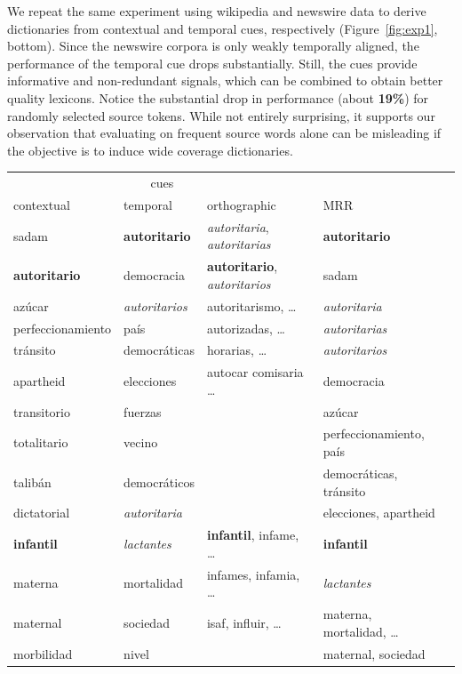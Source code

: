 \documentclass{article}
\newcommand{\figref}[1]{Figure~\ref{#1}}
\begin{document}
We repeat the same experiment using wikipedia and newswire data to derive dictionaries from contextual and temporal cues, respectively (\figref{fig:exp1}, bottom).  Since the newswire corpora is only weakly temporally aligned, the performance of the temporal cue drops substantially.  Still, the cues provide informative and non-redundant signals, which can be combined to obtain better quality lexicons.  Notice the substantial drop in performance (about {\bf 19\%}) for randomly selected source tokens.  While not entirely surprising, it supports our observation that evaluating on frequent source words alone can be misleading if the objective is to induce wide coverage dictionaries.\\

\begin{table}[h!]
\setlength{\tabcolsep}{1ex}
\footnotesize
\begin{center}
\begin{tabular}{lllll}
\multicolumn{3}{c}{cues}\\
\cline{1-3}
contextual		&	temporal	&	orthographic	&	MRR	\\
\hline
sadam	&	{\bf autoritario}	&	{\em autoritaria}, {\em autoritarias} &	{\bf autoritario}	\\
{\bf autoritario}	&	democracia	&	{\bf autoritario}, {\em autoritarios} &	sadam\\
az\'{u}car	&	{\em autoritarios}	&	autoritarismo, \dots &	{\em autoritaria}\\
perfeccionamiento	&	país	&	 autorizadas, \dots &	{\em autoritarias}\\
tr\'{a}nsito	&	democr\'{a}ticas	&	horarias, \dots &	{\em autoritarios}\\
apartheid	&	elecciones	&	autocar comisaria \dots &	democracia\\
transitorio	&	fuerzas	&	&	az\'{u}car\\
totalitario	&	vecino	&	&	perfeccionamiento, país\\
talib\'{a}n	&	democr\'{a}ticos	&	&	democr\'{a}ticas, tr\'{a}nsito\\
dictatorial	&	{\em autoritaria}	&	&	elecciones, apartheid\\
\hline
{\bf infantil}	&	{\em lactantes}	&	{\bf infantil}, infame, \dots &	{\bf infantil}\\
materna	&	mortalidad	&	infames, infamia, \dots &	{\em lactantes}\\
maternal	&	sociedad	&	isaf, influir, \dots &	materna, mortalidad, \dots\\
morbilidad	&	nivel	&	&	maternal, sociedad\\

\end{tabular}
\end{center}
\end{table}
\end{document}
